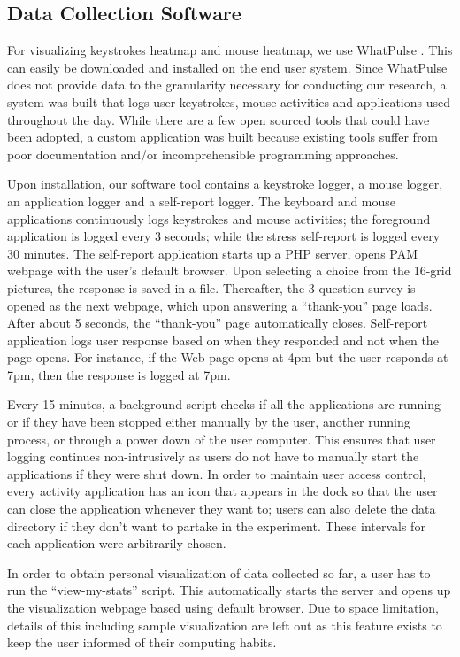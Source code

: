 \documentclass{article}
\begin{document}
\subsection{Data Collection Software}
For visualizing keystrokes heatmap and mouse heatmap, we use WhatPulse \cite{whatpulse}. This can easily be downloaded and installed on the end user system. Since WhatPulse does not provide data to the granularity necessary for conducting our research, a system was built that logs user keystrokes, mouse activities and applications used throughout the day. While there are a few open sourced tools that could have been adopted, a custom application was built because existing tools suffer from poor documentation and/or incomprehensible programming approaches. 

Upon installation, our software tool contains a keystroke logger, a mouse logger, an application logger and a self-report logger. The keyboard and mouse applications continuously logs keystrokes and mouse activities; the foreground application is logged every 3 seconds; while the stress self-report is logged every 30 minutes. The self-report application starts up a PHP server, opens PAM webpage with the user's default browser. Upon selecting a choice from the 16-grid pictures, the response is saved in a file. Thereafter, the 3-question survey is opened as the next webpage, which upon answering a ``thank-you'' page loads. After about 5 seconds, the ``thank-you'' page automatically closes. Self-report application logs user response based on when they responded and not when the page opens. For instance, if the Web page opens at 4pm but the user responds at 7pm, then the response is logged at 7pm. 

Every 15 minutes, a background script checks if all the applications are running or if they have been stopped either manually by the user, another running process, or through a power down of the user computer. This ensures that user logging continues non-intrusively as users do not have to manually start the applications if they were shut down. In order to maintain user access control, every activity application has an icon that appears in the dock so that the user can close the application whenever they want to; users can also delete the data directory if they don't want to partake in the experiment. These intervals for each application were arbitrarily chosen. 

In order to obtain personal visualization of data collected so far, a user has to run the ``view-my-stats'' script. This automatically starts the server and opens up the visualization webpage based using default browser. Due to space limitation, details of this including sample visualization are left out as this feature exists to keep the user informed of their computing habits. 
\end{document}
